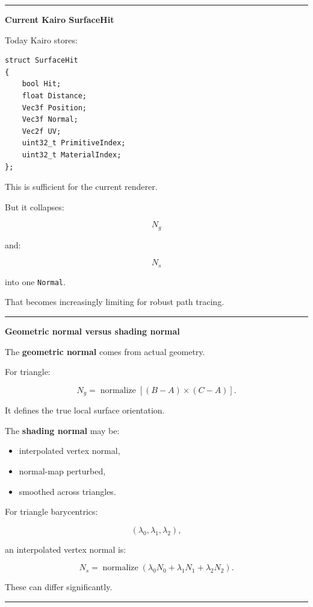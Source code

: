 \begin{center}\rule{0.5\linewidth}{0.5pt}\end{center}

\textbf{Current Kairo SurfaceHit}

Today Kairo stores:

\begin{verbatim}
struct SurfaceHit
{
    bool Hit;
    float Distance;
    Vec3f Position;
    Vec3f Normal;
    Vec2f UV;
    uint32_t PrimitiveIndex;
    uint32_t MaterialIndex;
};
\end{verbatim}

This is sufficient for the current renderer.

But it collapses:

\[
N_g
\]

and:

\[
N_s
\]

into one \texttt{Normal}.

That becomes increasingly limiting for robust path tracing.

\begin{center}\rule{0.5\linewidth}{0.5pt}\end{center}

\textbf{Geometric normal versus shading normal}

The \textbf{geometric normal} comes from actual geometry.

For triangle:

\[
\boxed{
N_g
=
\operatorname{normalize}
[
(B-A)\times(C-A)
].
}
\]

It defines the true local surface orientation.

The \textbf{shading normal} may be:

\begin{itemize}
\tightlist
\item
  interpolated vertex normal,
\item
  normal-map perturbed,
\item
  smoothed across triangles.
\end{itemize}

For triangle barycentrics:

\[
(\lambda_0,\lambda_1,\lambda_2),
\]

an interpolated vertex normal is:

\[
\boxed{
N_s=
\operatorname{normalize}
(
\lambda_0N_0+
\lambda_1N_1+
\lambda_2N_2
).
}
\]

These can differ significantly.

\begin{center}\rule{0.5\linewidth}{0.5pt}\end{center}


